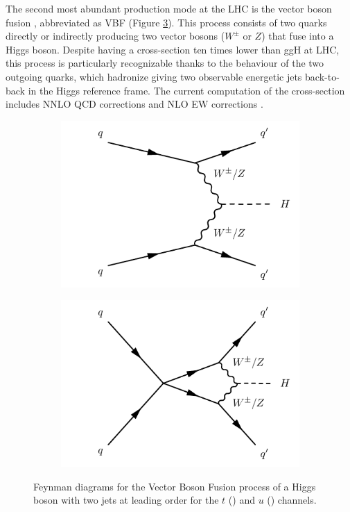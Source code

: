 The second most abundant production mode at the LHC is the vector boson fusion \cite{PhysRevD.85.035002}, abbreviated as VBF (Figure \ref{fig:vbf}). This process consists of two quarks directly or indirectly producing two vector bosons ($W^{\pm}$ or $Z$) that fuse into a Higgs boson. Despite having a cross-section ten times lower than ggH at LHC, this process is particularly recognizable thanks to the behaviour of the two outgoing quarks, which hadronize giving two observable energetic jets back-to-back in the Higgs reference frame. The current computation of the cross-section includes NNLO QCD corrections and NLO EW corrections \cite{deFlorian:2227475}.


\begin{figure}
\centering
\begin{subfigure}[b]{0.5\textwidth}
  \centering
  \includegraphics[width=\textwidth]{Images/VBF1.pdf}
  \caption{\label{fig:vbf1}}
\end{subfigure}%
\begin{subfigure}[b]{0.5\textwidth}
  \centering
  \includegraphics[width=\textwidth]{Images/VBF2.pdf}
  \caption{\label{fig:vbf2}}
\end{subfigure}
\caption{Feynman diagrams for the Vector Boson Fusion process of a Higgs boson with two jets at leading order for the $t$ () and $u$ () channels.}
\label{fig:vbf}
\end{figure}


